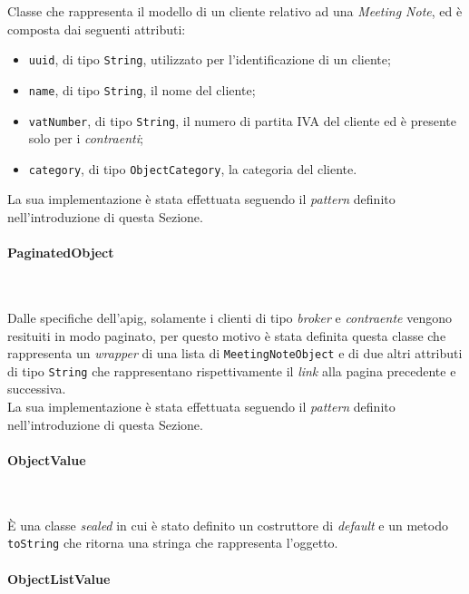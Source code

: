 \noindent Classe che rappresenta il modello di un \gls{cliente} relativo ad una \emph{Meeting Note}, ed è composta dai seguenti attributi:
\begin{itemize}
    \item \lstinline{uuid}, di tipo \lstinline{String}, utilizzato per l'identificazione di un \gls{cliente}\glsoccur;
    \item \lstinline{name}, di tipo \lstinline{String}, il nome del \gls{cliente}\glsoccur;
    \item \lstinline{vatNumber}, di tipo \lstinline{String}, il numero di partita IVA del \gls{cliente} ed è presente solo per i \emph{contraenti};
    \item \lstinline{category}, di tipo \lstinline{ObjectCategory}, la categoria del \gls{cliente}\glsoccur.
\end{itemize}
La sua implementazione è stata effettuata seguendo il \emph{pattern} definito nell'introduzione di questa Sezione.

\paragraph*{PaginatedObject} ~ \\
\label{par:paginated-object}

\noindent Dalle specifiche dell'\gls{apig}\glsoccur, solamente i clienti di tipo \emph{broker} e \emph{contraente} vengono resituiti in modo paginato, per questo motivo è stata definita questa classe che rappresenta un \emph{wrapper} di una lista di \lstinline{MeetingNoteObject} e di due altri attributi di tipo \lstinline{String} che rappresentano rispettivamente il \emph{link} alla pagina precedente e successiva.\\
La sua implementazione è stata effettuata seguendo il \emph{pattern} definito nell'introduzione di questa Sezione.

\paragraph*{ObjectValue} ~ \\
\label{par:object-value}

\noindent È una classe \emph{sealed} \cite{site:sealed-class} in cui è stato definito un costruttore di \emph{default} e un metodo \lstinline{toString} che ritorna una stringa che rappresenta l'oggetto.\\

\paragraph*{ObjectListValue} ~ \\
\label{par:object-list-value}

